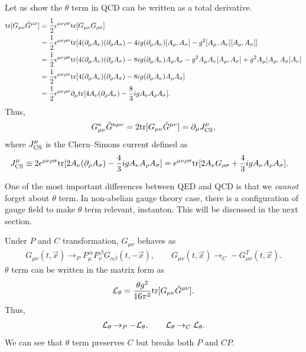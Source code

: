 \documentclass[11pt,a4paper]{article}
\begin{document}
Let us show the $\theta$ term in QCD can be written as a total derivative. 
\begin{align}
    {\rm tr}[G_{\mu\nu} \tilde G^{\mu\nu}]
    &= \frac{1}{2} \epsilon^{\mu\nu\rho\sigma} {\rm tr}[G_{\mu\nu} G_{\rho\sigma}] \nonumber\\
    &= \frac{1}{2} \epsilon^{\mu\nu\rho\sigma} {\rm tr}[4(\partial_\mu A_\nu) (\partial_\rho A_\sigma) - 4i g (\partial_\mu A_\nu) [A_\rho, A_\sigma] - g^2 [A_\mu, A_\nu][A_\rho, A_\sigma]] \nonumber\\
    &= \frac{1}{2} \epsilon^{\mu\nu\rho\sigma} {\rm tr}[4(\partial_\mu A_\nu) (\partial_\rho A_\sigma) - 8i g (\partial_\mu A_\nu) A_\rho A_\sigma - g^2 A_\mu A_\nu [A_\rho, A_\sigma] + g^2 A_\mu [A_\rho, A_\sigma] A_\nu] \nonumber\\
    &= \frac{1}{2} \epsilon^{\mu\nu\rho\sigma} {\rm tr}[4(\partial_\mu A_\nu) (\partial_\rho A_\sigma) - 8i g (\partial_\mu A_\nu) A_\rho A_\sigma] \nonumber\\
    &= \frac{1}{2} \epsilon^{\mu\nu\rho\sigma} \partial_\mu {\rm tr}[4 A_\nu (\partial_\rho A_\sigma) - \frac{8}{3}i g A_\nu A_\rho A_\sigma].
\end{align}
Thus,
\begin{align}
    G_{\mu\nu}^a \tilde G^{a\mu\nu} = 2 {\rm tr}[G_{\mu\nu} \tilde G^{\mu\nu}] = \partial_\mu J_{\rm CS}^\mu,
\end{align}
where $J_{\rm CS}^\mu$ is the Chern--Simons current defined as
\begin{align}
    J_{\rm CS}^\mu
    &\equiv 2\epsilon^{\mu\nu\rho\sigma} {\rm tr}[2 A_\nu (\partial_\rho A_\sigma) - \frac{4}{3}i g A_\nu A_\rho A_\sigma]
    = \epsilon^{\mu\nu\rho\sigma} {\rm tr}[ 2A_\nu G_{\rho\sigma} + \frac{4}{3}i g A_\nu A_\rho A_\sigma].
\end{align}

One of the most important differences between QED and QCD is that we \textit{cannot} forget about $\theta$ term.
In non-abelian gauge theory case, there is a configuration of gauge field to make $\theta$ term relevant, instanton.
This will be discussed in the next section.

Under $P$ and $C$ transformation, $G_{\mu\nu}$ behaves as
\begin{align}
    G_{\mu\nu}(t,\vec x) \to_P P_\mu^{~\alpha} P_\nu^{~\beta} G_{\alpha\beta}(t,-\vec x), \qquad
    G_{\mu\nu}(t,\vec x) \to_C -G_{\mu\nu}^T(t,\vec x).
\end{align}
$\theta$ term can be written in the matrix form as
\begin{align}
    {\cal L}_\theta = \frac{\theta g^2}{16\pi^2} {\rm tr}[G_{\mu\nu} \tilde G^{\mu\nu}].
\end{align}
Thus,
\begin{align}
    {\cal L}_\theta \to_P -{\cal L}_\theta, \qquad
    {\cal L}_\theta \to_C {\cal L}_\theta.
\end{align}
We can see that $\theta$ term preserves $C$ but breaks both $P$ and $CP$.
\end{document}
